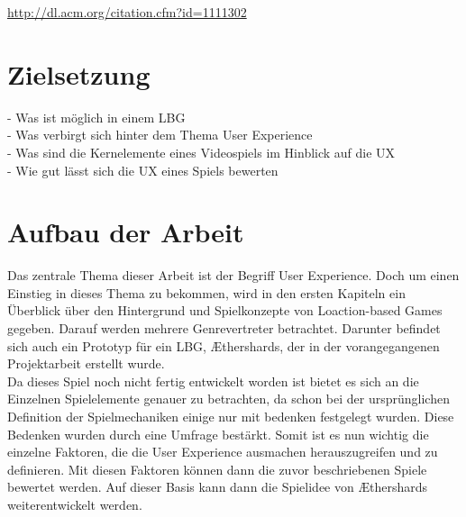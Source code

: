 \url{http://dl.acm.org/citation.cfm?id=1111302}

\section{Zielsetzung}
\label{sec:zielsetzung}


- Was ist möglich in einem LBG\\
- Was verbirgt sich hinter dem Thema User Experience\\
- Was sind die Kernelemente eines Videospiels im Hinblick auf die UX\\
- Wie gut lässt sich die UX eines Spiels bewerten\\


\section{Aufbau der Arbeit}
\label{sec:aufbauDArbeit}

Das zentrale Thema dieser Arbeit ist der Begriff User Experience. Doch um einen Einstieg in dieses Thema zu bekommen, wird in den ersten Kapiteln ein Überblick über den Hintergrund und Spielkonzepte von Loaction-based Games gegeben. Darauf werden mehrere Genrevertreter betrachtet. Darunter befindet sich auch ein Prototyp für ein LBG, Æthershards, der in der vorangegangenen Projektarbeit erstellt wurde. \\
Da dieses Spiel noch nicht fertig entwickelt worden ist bietet es sich an die Einzelnen Spielelemente genauer zu betrachten, da schon bei der ursprünglichen Definition der Spielmechaniken einige nur mit bedenken festgelegt wurden. Diese Bedenken wurden durch eine Umfrage bestärkt. 
Somit ist es nun wichtig die einzelne Faktoren, die die User Experience ausmachen herauszugreifen und zu definieren. Mit diesen Faktoren können dann die zuvor beschriebenen Spiele bewertet werden. Auf dieser Basis kann dann die Spielidee von Æthershards weiterentwickelt werden.
%

